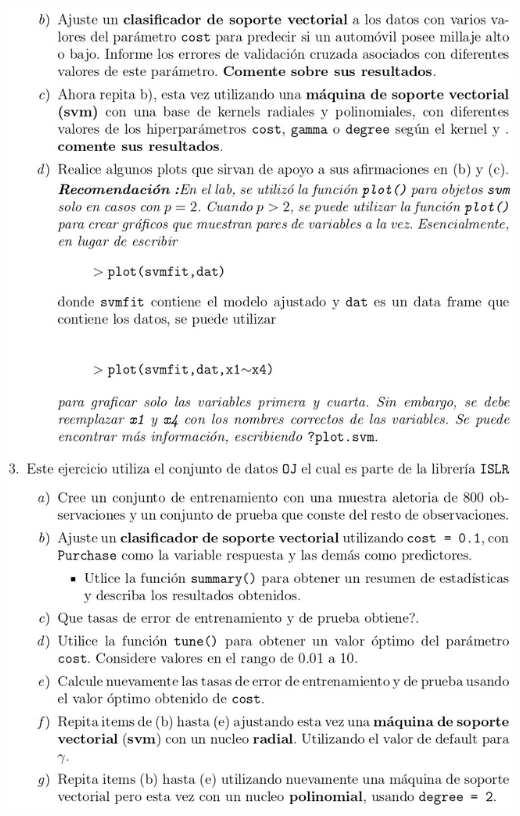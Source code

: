 \documentclass[
]{article}
\begin{document}
\begin{center}\includegraphics[width=0.9\linewidth]{Trabajo1_Mod3_Sem0220_page-0002} \end{center}
\end{document}
